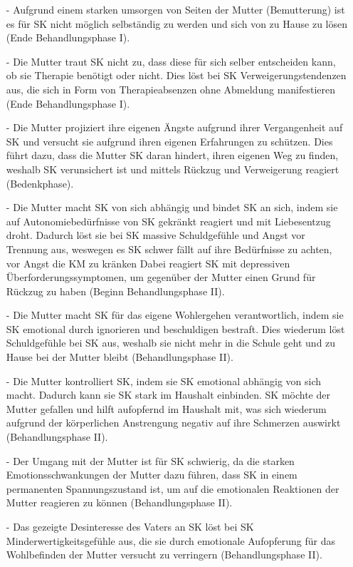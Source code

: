 \begin{itemize}
 \item [-]Aufgrund einem starken umsorgen von Seiten der Mutter (Bemutterung) ist es für SK nicht möglich selbständig zu werden und sich von zu Hause zu lösen (Ende Behandlungsphase I). 
 \item [-]Die Mutter traut SK nicht zu, dass diese für sich selber entscheiden kann, ob sie Therapie benötigt oder nicht. Dies löst bei SK Verweigerungstendenzen aus, die sich in Form von Therapieabsenzen ohne Abmeldung manifestieren (Ende Behandlungsphase I). 
 \item [-] Die Mutter projiziert ihre eigenen Ängste aufgrund ihrer Vergangenheit auf SK und versucht sie aufgrund ihren eigenen Erfahrungen zu schützen. Dies führt dazu, dass die Mutter SK daran hindert, ihren eigenen Weg zu finden, weshalb SK verunsichert ist und mittels Rückzug und Verweigerung reagiert (Bedenkphase). 
 \item [-] Die Mutter macht SK von sich abhängig und bindet SK an sich, indem sie auf Autonomiebedürfnisse von SK gekränkt reagiert und mit Liebesentzug droht. Dadurch löst sie bei SK massive Schuldgefühle und Angst vor Trennung aus, weswegen es SK schwer fällt auf ihre Bedürfnisse zu achten, vor Angst die KM zu kränken Dabei reagiert SK mit depressiven Überforderungssymptomen, um gegenüber der Mutter einen Grund für Rückzug zu haben (Beginn Behandlungsphase II). 
 \item [-] Die Mutter macht SK für das eigene Wohlergehen verantwortlich, indem sie SK emotional durch ignorieren und beschuldigen bestraft. Dies wiederum löst Schuldgefühle bei SK aus, weshalb sie nicht mehr in die Schule geht und zu Hause bei der Mutter bleibt (Behandlungsphase II). 
 \item [-] Die Mutter kontrolliert SK, indem sie SK emotional abhängig von sich macht. Dadurch kann sie SK stark im Haushalt einbinden. SK möchte der Mutter gefallen und hilft aufopfernd im Haushalt mit, was sich wiederum aufgrund der körperlichen Anstrengung negativ auf ihre Schmerzen auswirkt (Behandlungsphase II).
 \item [-] Der Umgang mit der Mutter ist für SK schwierig, da die starken Emotionsschwankungen der Mutter dazu führen, dass SK in einem permanenten Spannungszustand ist, um auf die emotionalen Reaktionen der Mutter reagieren zu können (Behandlungsphase II). 
 \item [-] Das gezeigte Desinteresse des Vaters an SK löst bei SK Minderwertigkeitsgefühle aus, die sie durch emotionale Aufopferung für das Wohlbefinden der Mutter versucht zu verringern (Behandlungsphase II).

\end{itemize}
